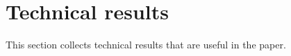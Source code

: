 \documentclass[11pt,letterpaper]{article}
\newtheorem{lemma}[thm]{Lemma}
\newcommand{\R}{\mathbb{R}}
\begin{document}





\appendix











\section{Technical results}\label{sec:technical}

This section collects technical results that are useful in the paper.
\end{document}
